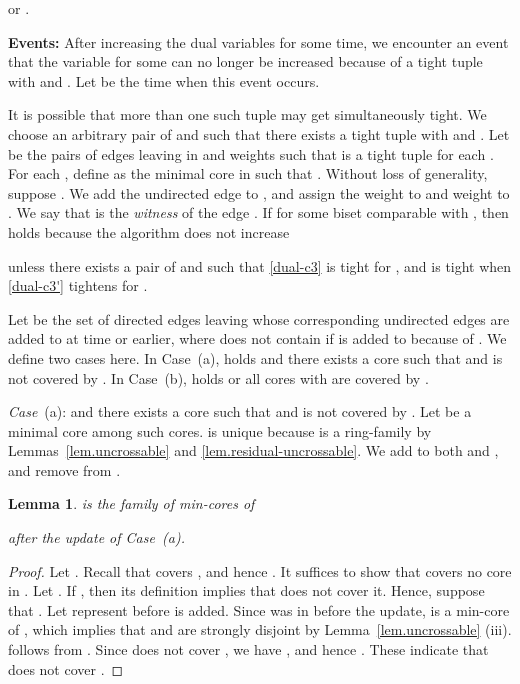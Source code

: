 \documentclass[11pt]{article}
\newtheorem{lemma}{Lemma}
\begin{document}
or .



{\bf Events:}
After increasing the dual variables for some time, 
we encounter an event that the variable  for some  can no longer be increased
because of a tight tuple  with  and .
Let  be the time when this event occurs.

It is possible that 
more than one such tuple may get simultaneously tight.
We choose an arbitrary pair of  and 
such that there exists a tight tuple  with 
and .
Let  be the pairs of edges leaving  in
 and weights such that 
 is a tight tuple for each .
For each , define
 as the 
minimal core in  such that .
Without loss of generality, 
suppose .
We add the
undirected edge  to , and assign the weight  to 
and weight  to .
We say that  is the {\em witness} of the edge .
If  for some biset  comparable with
, then 
 holds
because
the algorithm does not increase

unless there exists a pair of 
and 
such that 
\eqref{dual-c3} is tight for , and  is tight when
\eqref{dual-c3'} tightens for .


Let  be the set of directed edges leaving  whose corresponding
undirected edges are added to  at time  or earlier, where
 does not contain  if  is added to  because of .
We define two cases here.
In Case~(a),   holds 
and 
there exists a core  such that 
 and  is not covered by .
In Case~(b),  holds or 
all cores  with  are covered by .

{\em Case}~(a): 
and 
there exists a core  such that 
 and  is not covered by .
Let  be a minimal core among such cores.  is
unique because  is a ring-family by
Lemmas~\ref{lem.uncrossable} and \ref{lem.residual-uncrossable}.
We add  to both  and , and remove
 from .

\begin{lemma}\label{lem.afam}
   is the family of min-cores of
 
 after the update of Case~{\rm (}a\/{\rm )}.
\end{lemma}
\begin{proof}
 Let .
 Recall that  covers , and hence .
 It suffices to show that  covers no core in .
 Let . If , then its definition
 implies that  does not cover it.
 Hence, suppose that .
 Let  represent  before  is added.
 Since  was in  before the update,
  is a min-core of  , which 
 implies that  and  are strongly disjoint by
 Lemma~\ref{lem.uncrossable} (iii).
  follows from .
 Since 
  does not cover , we have , and 
 hence .
 These indicate that  does not cover .
\end{proof}
\end{document}
